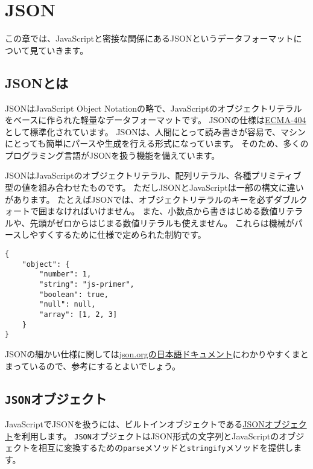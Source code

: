 \hypertarget{json}{%
\chapter{JSON}\label{json}}

この章では、JavaScriptと密接な関係にあるJSONというデータフォーマットについて見ていきます。

\hypertarget{what-is-json}{%
\section{JSONとは}\label{what-is-json}}

JSONはJavaScript Object
Notationの略で、JavaScriptのオブジェクトリテラルをベースに作られた軽量なデータフォーマットです。
JSONの仕様は\href{http://www.ecma-international.org/publications/files/ECMA-ST/ECMA-404.pdf}{ECMA-404}として標準化されています。
JSONは、人間にとって読み書きが容易で、マシンにとっても簡単にパースや生成を行える形式になっています。
そのため、多くのプログラミング言語がJSONを扱う機能を備えています。

JSONはJavaScriptのオブジェクトリテラル、配列リテラル、各種プリミティブ型の値を組み合わせたものです。
ただしJSONとJavaScriptは一部の構文に違いがあります。
たとえばJSONでは、オブジェクトリテラルのキーを必ずダブルクォートで囲まなければいけません。
また、小数点から書きはじめる数値リテラルや、先頭がゼロからはじまる数値リテラルも使えません。
これらは機械がパースしやすくするために仕様で定められた制約です。

\begin{lstlisting}
{
    "object": { 
        "number": 1, 
        "string": "js-primer",
        "boolean": true,
        "null": null,
        "array": [1, 2, 3]
    }
}
\end{lstlisting}

JSONの細かい仕様に関しては\href{http://www.json.org/json-ja.html}{json.orgの日本語ドキュメント}にわかりやすくまとまっているので、参考にするとよいでしょう。

\hypertarget{json-object}{%
\section{\texorpdfstring{\texttt{JSON}オブジェクト}{JSONオブジェクト}}\label{json-object}}

JavaScriptでJSONを扱うには、ビルトインオブジェクトである\href{https://developer.mozilla.org/ja/docs/Web/JavaScript/Reference/Global_Objects/JSON}{JSONオブジェクト}を利用します。
\texttt{JSON}オブジェクトはJSON形式の文字列とJavaScriptのオブジェクトを相互に変換するための\texttt{parse}メソッドと\texttt{stringify}メソッドを提供します。

